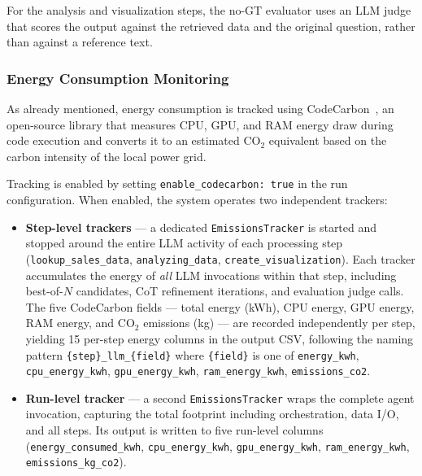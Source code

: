 For the analysis and visualization steps, the no-GT evaluator uses an LLM judge
that scores the output against the retrieved data and the original question, rather
than against a reference text.

\subsubsection{Energy Consumption Monitoring}

As already mentioned, energy consumption is tracked using
CodeCarbon~\cite{lottick2019codecarbon}, an
open-source library that measures CPU, GPU, and RAM energy draw during code
execution and converts it to an estimated CO$_2$ equivalent based on the carbon
intensity of the local power grid.

Tracking is enabled by setting \texttt{enable\_codecarbon: true} in the run
configuration. When enabled, the system operates two independent trackers:

\begin{itemize}
    \item \textbf{Step-level trackers} — a dedicated \texttt{EmissionsTracker} is
          started and stopped around the entire LLM activity of each processing step
          (\texttt{lookup\_sales\_data}, \texttt{analyzing\_data},
          \texttt{create\_visualization}). Each tracker accumulates the energy of
          \emph{all} LLM invocations within that step, including best-of-$N$
          candidates, CoT refinement iterations, and evaluation judge calls.
          The five CodeCarbon fields — total energy (kWh), CPU energy, GPU energy,
          RAM energy, and CO$_2$ emissions (kg) — are recorded independently per
          step, yielding 15 per-step energy columns in the output CSV, following
          the naming pattern \texttt{\{step\}\_llm\_\{field\}} where \texttt{\{field\}}
          is one of \texttt{energy\_kwh}, \texttt{cpu\_energy\_kwh},
          \texttt{gpu\_energy\_kwh}, \texttt{ram\_energy\_kwh},
          \texttt{emissions\_co2}.
    \item \textbf{Run-level tracker} — a second \texttt{EmissionsTracker} wraps the
          complete agent invocation, capturing the total footprint including
          orchestration, data I/O, and all steps. Its output is written to five
          run-level columns (\texttt{energy\_consumed\_kwh}, \texttt{cpu\_energy\_kwh},
          \texttt{gpu\_energy\_kwh}, \texttt{ram\_energy\_kwh},
          \texttt{emissions\_kg\_co2}).
\end{itemize}

